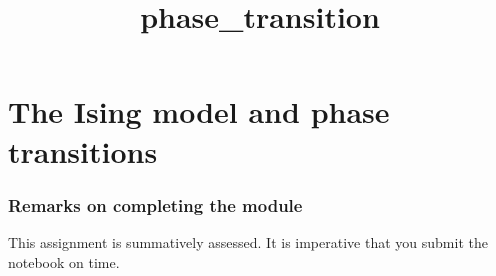 \documentclass[11pt]{article}
\title{phase\_transition}
\begin{document}
    
    
    \maketitle
    
    

    
    \hypertarget{the-ising-model-and-phase-transitions}{%
\section{The Ising model and phase
transitions}\label{the-ising-model-and-phase-transitions}}

    \hypertarget{remarks-on-completing-the-module}{%
\subsubsection{Remarks on completing the
module}\label{remarks-on-completing-the-module}}

This assignment is summatively assessed. It is imperative that you
submit the notebook on time.
\end{document}
